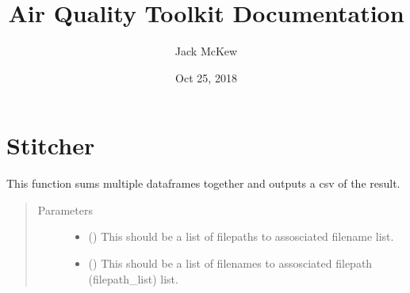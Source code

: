 \documentclass[letterpaper,10pt,english,openany,oneside]{sphinxmanual}
\title{Air Quality Toolkit Documentation}
\date{Oct 25, 2018}
\author{Jack McKew}
\begin{document}
\pagestyle{empty}
\maketitle
\pagestyle{plain}
\sphinxtableofcontents
\pagestyle{normal}
\label{\detokenize{index::doc}}



\chapter{Stitcher}
\label{\detokenize{index:module-Stitcher}}\label{\detokenize{index:stitcher}}

\begin{fulllineitems}
\label{\detokenize{index:Stitcher.Stitcher}}
This function sums multiple dataframes together and outputs a csv of the result.
\begin{quote}\begin{description}
\item[{Parameters}] \leavevmode\begin{itemize}
\item {} 
 (\sphinxstyleliteralemphasis{\sphinxupquote{{[}}}\sphinxstyleliteralemphasis{\sphinxupquote{{]}}}\sphinxstyleliteralemphasis{\sphinxupquote{}}) \textendash{} This should be a list of filepaths to assosciated filename list.

\item {} 
 (\sphinxstyleliteralemphasis{\sphinxupquote{{[}}}\sphinxstyleliteralemphasis{\sphinxupquote{{]}}}\sphinxstyleliteralemphasis{\sphinxupquote{}}) \textendash{} This should be a list of filenames to assosciated filepath (filepath\_list) list.


\end{itemize}
\end{description}
\end{quote}
\end{fulllineitems}
\end{document}
